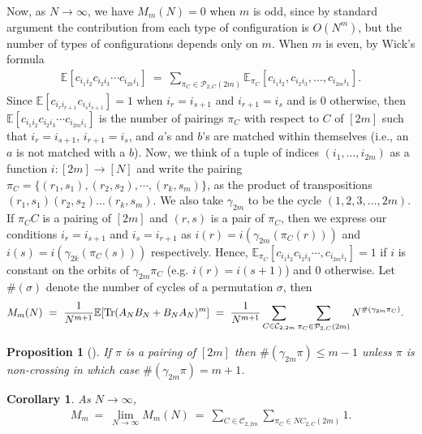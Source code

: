 \documentclass[11pt,reqno]{amsart}
\numberwithin{equation}{section}
\theoremstyle{plain}
\newtheorem{corollary}[thm]{Corollary}
\newtheorem{proposition}[thm]{Proposition}
\begin{document}
Now, as $N\rightarrow\infty$, we have $M_m(N)=0$ when $m$ is odd, since by standard argument the contribution from each type of configuration is $O(N^{m})$, but the number of types of configurations depends only on $m$. When $m$ is even, by Wick's formula
\begin{align}
\mathbb{E}[c_{i_1i_2}c_{i_2i_3}\cdots c_{i_{2k}i_1}] \ = \ \sum_{
\pi_C\in\mathcal{P}_{2,C}(2m)}\mathbb{E}_{\pi_C}[c_{i_1i_2},c_{i_2i_3},\dots, c_{i_{2m}i_1}].
\end{align}
Since $\mathbb{E}[c_{i_ri_{r+1}}c_{i_si_{s+1}}]=1$ when $i_r=i_{s+1}$ and $i_{r+1}=i_{s}$ and is 0 otherwise, then $\mathbb{E}[c_{i_1i_2}c_{i_2i_3}\cdots c_{i_{2m}i_1}]$ is the number of pairings $\pi_C$ with respect to $C$ of $[2m]$ such that $i_r=i_{s+1}$, $i_{r+1}=i_s$, and $a$'s and $b$'s are matched within themselves (i.e., an $a$ is not matched with a $b$). Now, we think of a tuple of indices $(i_1,\dots, i_{2m})$ as a function $i:[2m]\rightarrow [N]$ and write the pairing $\pi_C=\{(r_1,s_1), (r_2, s_2), \cdots, (r_{k},s_{m})\}$, as the product of transpositions $(r_1,s_1)(r_2,s_2)\dots(r_k,s_m)$. We also take $\gamma_{2m}$ to be the cycle $(1, 2, 3, \dots, 2m)$. If $\pi_CC$ is a pairing of $[2m]$ and $(r,s)$ is a pair of $\pi_C$, then we express our conditions $i_r=i_{s+1}$ and $i_s=i_{r+1}$ as $i(r)=i(\gamma_{2m}(\pi_C(r)))$ and $i(s)=i(\gamma_{2k}(\pi_C(s)))$ respectively. Hence, $\mathbb{E}_{\pi_C}[c_{i_1i_2}c_{i_2i_3}\cdots, c_{i_{2m}i_1}]=1$ if $i$ is constant on the orbits of $\gamma_{2m}\pi_C$ (e.g. $i(r)=i(s+1)$) and $0$ otherwise. Let $\#(\sigma)$ denote the number of cycles of a permutation $\sigma$, then
\begin{align}
M_m(N) \ = \ \frac{1}{N^{m+1}}\mathbb{E}[\textup{Tr}(A_NB_N+B_NA_N)^m] &\ = \ \frac{1}{N^{m+1}}\sum_{C\in \mathcal{C}_{2,2m}}\sum_{\pi_C\in \mathcal{P}_{2,C}(2m)}N^{\#(\gamma_{2m}\pi_C)}.
\end{align}

\begin{proposition}[\cite{MS}]\label{non-crossing}
If $\pi$ is a pairing of $[2m]$ then $\#(\gamma_{2m}\pi)\leq m-1$ unless $\pi$ is non-crossing in which case $\#(\gamma_{2m}\pi)=m+1$.
\end{proposition}

\begin{corollary}
As $N\rightarrow \infty$,
\begin{align}\label{genusGOEGOE}
M_m \ = \ \lim_{N\rightarrow\infty} M_m(N) \ = \ \sum_{C\in \mathcal{C}_{2,2m}}\sum_{\pi_C\in NC_{2,C}(2m)}1.
\end{align}
\end{corollary}
\end{document}
